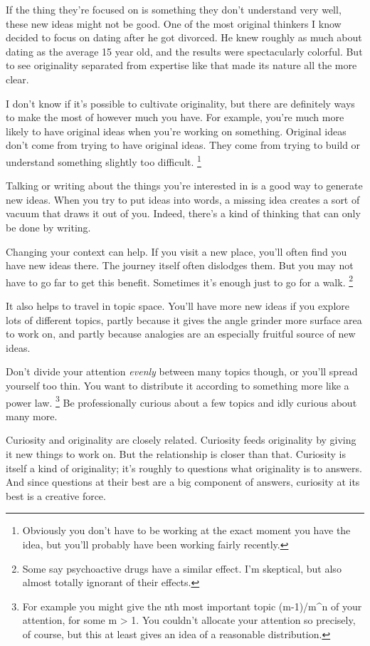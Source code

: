 If the thing they're focused on is something they don't understand very
well, these new ideas might not be good. One of the most original
thinkers I know decided to focus on dating after he got divorced. He
knew roughly as much about dating as the average 15 year old, and the
results were spectacularly colorful. But to see originality separated
from expertise like that made its nature all the more clear.

I don't know if it's possible to cultivate originality, but there are
definitely ways to make the most of however much you have. For example,
you're much more likely to have original ideas when you're working on
something. Original ideas don't come from trying to have original ideas.
They come from trying to build or understand something slightly too
difficult. \footnote{Obviously you don't have to be working at the exact moment you
have the idea, but you'll probably have been working fairly recently.}

Talking or writing about the things you're interested in is a good way
to generate new ideas. When you try to put ideas into words, a missing
idea creates a sort of vacuum that draws it out of you. Indeed, there's
a kind of thinking that can only be done by writing.

Changing your context can help. If you visit a new place, you'll often
find you have new ideas there. The journey itself often dislodges them.
But you may not have to go far to get this benefit. Sometimes it's
enough just to go for a walk. \footnote{Some say psychoactive drugs have a similar effect. I'm
skeptical, but also almost totally ignorant of their effects.}

It also helps to travel in topic space. You'll have more new ideas if
you explore lots of different topics, partly because it gives the angle
grinder more surface area to work on, and partly because analogies are
an especially fruitful source of new ideas.

Don't divide your attention \emph{evenly} between many topics though, or
you'll spread yourself too thin. You want to distribute it according to
something more like a power law. \footnote{For example you might give the nth most important topic
(m-1)/m\^{}n of your attention, for some m \textgreater{} 1. You
couldn't allocate your attention so precisely, of course, but this at
least gives an idea of a reasonable distribution.} Be
professionally curious about a few topics and idly curious about many
more.

Curiosity and originality are closely related. Curiosity feeds
originality by giving it new things to work on. But the relationship is
closer than that. Curiosity is itself a kind of originality; it's
roughly to questions what originality is to answers. And since questions
at their best are a big component of answers, curiosity at its best is a
creative force.


